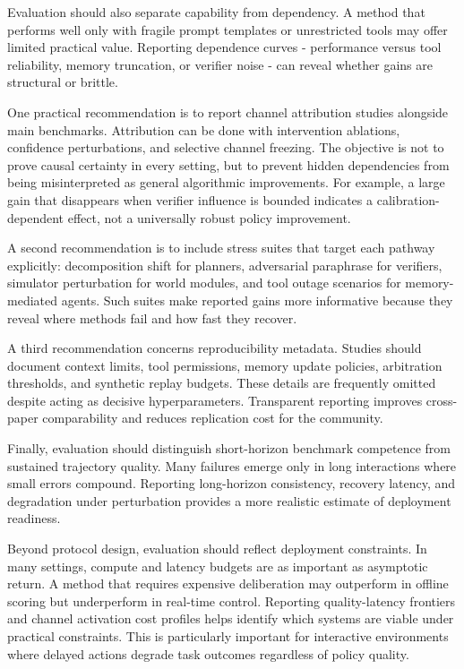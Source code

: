 \documentclass[pdflatex,sn-mathphys-num]{sn-jnl}
\begin{document}
Evaluation should also separate capability from dependency. A method that performs well only with fragile prompt templates or unrestricted tools may offer limited practical value. Reporting dependence curves - performance versus tool reliability, memory truncation, or verifier noise - can reveal whether gains are structural or brittle.

One practical recommendation is to report channel attribution studies alongside main benchmarks. Attribution can be done with intervention ablations, confidence perturbations, and selective channel freezing. The objective is not to prove causal certainty in every setting, but to prevent hidden dependencies from being misinterpreted as general algorithmic improvements. For example, a large gain that disappears when verifier influence is bounded indicates a calibration-dependent effect, not a universally robust policy improvement.

A second recommendation is to include stress suites that target each pathway explicitly: decomposition shift for planners, adversarial paraphrase for verifiers, simulator perturbation for world modules, and tool outage scenarios for memory-mediated agents. Such suites make reported gains more informative because they reveal where methods fail and how fast they recover.

A third recommendation concerns reproducibility metadata. Studies should document context limits, tool permissions, memory update policies, arbitration thresholds, and synthetic replay budgets. These details are frequently omitted despite acting as decisive hyperparameters. Transparent reporting improves cross-paper comparability and reduces replication cost for the community.

Finally, evaluation should distinguish short-horizon benchmark competence from sustained trajectory quality. Many failures emerge only in long interactions where small errors compound. Reporting long-horizon consistency, recovery latency, and degradation under perturbation provides a more realistic estimate of deployment readiness.

Beyond protocol design, evaluation should reflect deployment constraints. In many settings, compute and latency budgets are as important as asymptotic return. A method that requires expensive deliberation may outperform in offline scoring but underperform in real-time control. Reporting quality-latency frontiers and channel activation cost profiles helps identify which systems are viable under practical constraints. This is particularly important for interactive environments where delayed actions degrade task outcomes regardless of policy quality.
\end{document}
